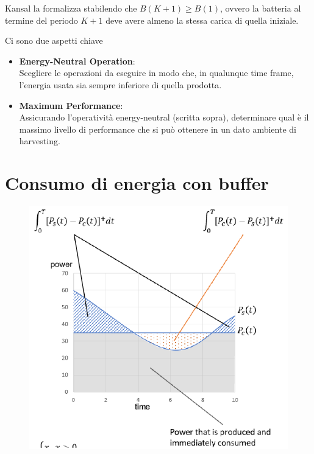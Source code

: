 Kansal la formalizza stabilendo che $B(K+1) \geq B(1)$, ovvero la batteria al termine del periodo $K+1$ deve avere almeno la stessa carica di quella iniziale.


{Ci sono due aspetti chiave
\begin{itemize}
   \item \textbf{Energy-Neutral Operation}:\\
   Scegliere le operazioni da eseguire in modo che, in qualunque time frame, l'energia usata sia sempre inferiore di quella prodotta.
   \item \textbf{Maximum Performance}:\\
   Assicurando l'operatività energy-neutral (scritta sopra), determinare qual è il massimo livello di performance che si può ottenere in un dato ambiente di harvesting.
\end{itemize}
}

\section{Consumo di energia con buffer}

\begin{figure}[htbp]
   \centering
   \includegraphics{images/questions/Schermata del 2023-10-20 11-54-15.png}
   \label{fig:dom25}
\end{figure}

